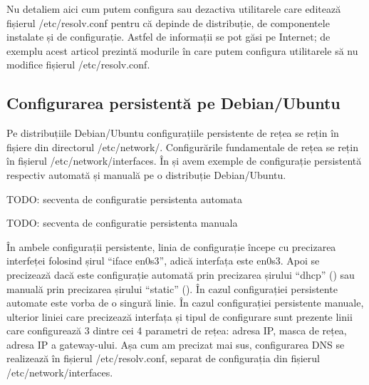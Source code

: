 Nu detaliem aici cum putem configura sau dezactiva utilitarele care editează fișierul /etc/resolv.conf pentru că depinde de distribuție, de componentele instalate și de configurație. Astfel de informații se pot găsi pe Internet; de exemplu acest articol prezintă modurile în care putem configura utilitarele să nu modifice fișierul /etc/resolv.conf.

\subsection{Configurarea persistentă pe Debian/Ubuntu}
\label{sec:net:persistent-config-debian}

Pe distribuțiile Debian/Ubuntu configurațiile persistente de rețea se rețin în fișiere din directorul /etc/network/. Configurările fundamentale de rețea se rețin în fișierul /etc/network/interfaces. În  și  avem exemple de configurație persistentă respectiv automată și manuală pe o distribuție Debian/Ubuntu.

\begin{screen}[caption={Configurare persistentă automată pe Debian/Ubuntu},label={lst:net:persistent-automatic-debian}]
TODO: secventa de configuratie persistenta automata
\end{screen}

\begin{screen}[caption={Configurare persistentă manuală pe Debian/Ubuntu},label={lst:net:persistent-manual-debian}]
TODO: secventa de configuratie persistenta manuala
\end{screen}

În ambele configurații persistente, linia de configurație începe cu precizarea interfeței folosind șirul “iface en0s3”, adică interfața este en0s3. Apoi se precizează dacă este configurație automată prin precizarea șirului “dhcp” () sau manuală prin precizarea șirului “static” (). În cazul configurației persistente automate este vorba de o singură linie. În cazul configurației persistente manuale, ulterior liniei care precizează interfața și tipul de configurare sunt prezente linii care configurează 3 dintre cei 4 parametri de rețea: adresa IP, masca de rețea, adresa IP a gateway-ului. Așa cum am precizat mai sus, configurarea DNS se realizează în fișierul /etc/resolv.conf, separat de configurația din fișierul /etc/network/interfaces.

